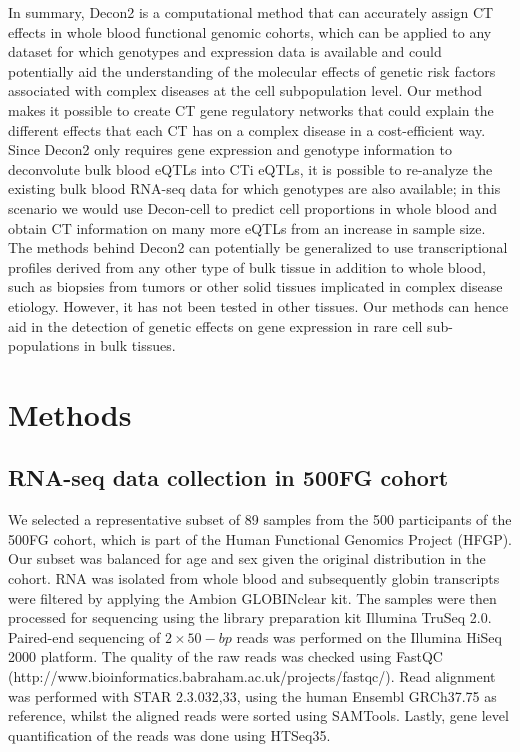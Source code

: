 In summary, Decon2 is a computational method that can accurately assign CT effects in whole blood functional genomic cohorts, which can be applied to any dataset for which genotypes and expression data is available and could potentially aid the understanding of the molecular effects of genetic risk factors associated with complex diseases at the cell subpopulation level. Our method makes it possible to create CT gene regulatory networks that could explain the different effects that each CT has on a complex disease in a cost-efficient way. Since Decon2 only requires  gene expression and genotype information to deconvolute bulk blood eQTLs into CTi eQTLs, it is possible to re-analyze the existing bulk blood RNA-seq data for which genotypes are also available; in this scenario we would use Decon-cell to predict cell proportions in whole blood and obtain CT information on many more eQTLs from an increase in sample size. The methods behind Decon2 can potentially be generalized to use transcriptional profiles derived from any other type of bulk tissue in addition to whole blood, such as biopsies from tumors or other solid tissues implicated in complex disease etiology. However, it has not been tested in other tissues. Our methods can hence aid in the detection of genetic effects on gene expression in rare cell sub-populations in bulk tissues. 

\section{Methods}
\subsection{RNA-seq data collection in 500FG cohort}
We selected a representative subset of 89 samples from the 500 participants of the 500FG cohort, which is part of the Human Functional Genomics Project (HFGP). Our subset was balanced for age and sex given the original distribution in the cohort. RNA was isolated from whole blood and subsequently globin transcripts were filtered by applying the Ambion GLOBINclear kit. The samples were then processed for sequencing using the library preparation kit Illumina TruSeq 2.0. Paired-end sequencing of $2 \times 50-bp$ reads was performed on the Illumina HiSeq 2000 platform. The quality of the raw reads was checked using FastQC (http://www.bioinformatics.babraham.ac.uk/projects/fastqc/). Read alignment was performed with STAR 2.3.032,33, using the human Ensembl GRCh37.75 as reference, whilst the aligned reads were sorted using SAMTools\cite{liSequenceAlignmentMap2009}. Lastly, gene level quantification of the reads was done using HTSeq35.

